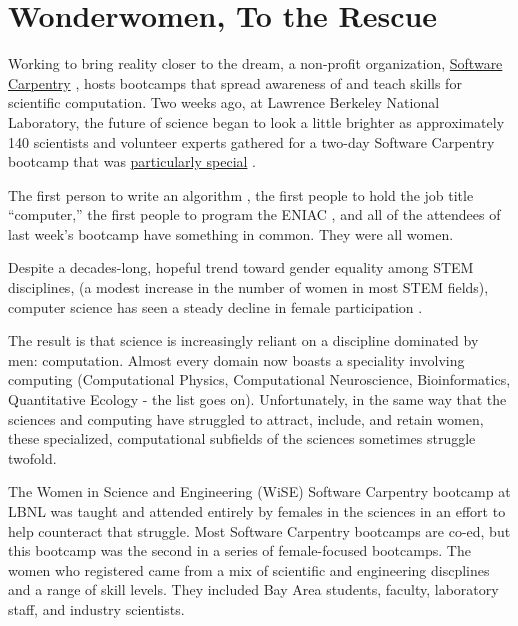 \documentclass[letterpaper]{article}
\begin{document}

\section*{Wonderwomen, To the Rescue}

Working to bring reality closer to the dream, a non-profit organization, 
\href{http://software-carpentry.org}{Software Carpentry} 
\cite{wilson_software_2014}, hosts bootcamps that spread awareness of and teach 
skills for scientific computation. Two weeks ago, at Lawrence Berkeley National 
Laboratory, the future of science began to look a little brighter as 
approximately 140 scientists and volunteer experts gathered for a two-day 
Software Carpentry bootcamp that was 
\href{http://swcarpentry.github.io/2014-04-14-wise}{particularly special} 
\cite{huff_software_2014}.  

The first person to write an algorithm \cite{toole_ada_1992}, the first people 
to hold the job title ``computer,'' the first people to program the ENIAC 
\cite{grier_when_2013}, and all of the attendees of last week's bootcamp have 
something in common. They were all women.  

Despite a decades-long, hopeful trend toward gender equality among STEM disciplines, 
(a modest increase in the number of women in most STEM fields), 
computer science has seen a steady decline in female participation 
\cite{nsf_women_2013}.

The result is that science is increasingly reliant on a discipline dominated by 
men: computation.  Almost every domain now boasts a speciality involving 
computing (Computational Physics, Computational Neuroscience, Bioinformatics, 
Quantitative Ecology - the list goes on). Unfortunately, in the same way that 
the sciences and computing have struggled to attract, include, and retain women, 
these specialized, computational subfields of the sciences sometimes struggle 
twofold.  

The Women in Science and Engineering (WiSE) Software Carpentry bootcamp at LBNL 
was taught and attended entirely by females in the sciences in an effort to help 
counteract that struggle.  Most Software Carpentry bootcamps are co-ed, but this 
bootcamp was the second in a series of female-focused bootcamps. The women who 
registered came from a mix of scientific and engineering discplines and a range 
of skill levels.  They included Bay Area students, faculty, laboratory staff, 
and industry scientists.
\end{document}
